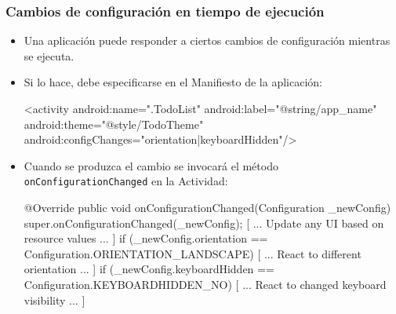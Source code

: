 \documentclass[hyperref={pdfpagelabels=true},ucs]{beamer}
\begin{document}
\begin{frame}[fragile,shrink=10]
\frametitle{Cambios de configuración en tiempo de ejecución}

\begin{itemize}
\item Una aplicación puede responder a ciertos cambios de configuración
  mientras se ejecuta. 
\item Si lo hace, debe especificarse en el Manifiesto de la
  aplicación:

\begin{tiny}
\begin{block}{}
\begin{xml}
<activity android:name=".TodoList"
          android:label="@string/app_name"
          android:theme="@style/TodoTheme"
          android:configChanges="orientation|keyboardHidden"/>
\end{xml}
\end{block}
\end{tiny}

\item Cuando se produzca el cambio se invocará el método
  \verb|onConfigurationChanged| en la Actividad:

\begin{tiny}
\begin{block}{}
\begin{java}
@Override
public void onConfigurationChanged(Configuration _newConfig) {
  super.onConfigurationChanged(_newConfig);
  [ ... Update any UI based on resource values ... ]
  if (_newConfig.orientation == Configuration.ORIENTATION_LANDSCAPE) {
    [ ... React to different orientation ... ]
  }
  if (_newConfig.keyboardHidden == Configuration.KEYBOARDHIDDEN_NO) {
    [ ... React to changed keyboard visibility ... ]
  }
}
\end{java}
\end{block}
\end{tiny}


\end{itemize}

\end{frame}
\end{document}
